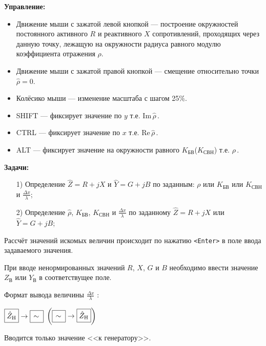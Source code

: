 \documentclass[12pt,a4paper]{article}
\newcommand{\im}{\mathrm{Im}}
\newcommand{\re}{\mathrm{Re}}
\newcommand{\ro}{\hat{\rho}}
\newcommand{\z}{\hat{Z}}
\newcommand{\y}{\hat{Y}}
\newcommand{\zv}{Z_{\text{В}}}
\newcommand{\yv}{Y_{\text{В}}}
\newcommand{\zn}{\hat{Z}_{\text{H}}}
\newcommand{\kb}{K_{\text{БВ}}}
\newcommand{\ks}{K_{\text{СВН}}}
\newcommand{\dxl}{\displaystyle\frac{\Delta x}{\lambda}}
\begin{document}
	\thispagestyle{empty}
	\textbf{Управление:}
	\begin{itemize}
		\item Движение мыши с зажатой левой кнопкой --- построение окружностей постоянного активного $R$ и
		реактивного $X$ сопротивлений, проходящих через данную точку, лежащую на окружности радиуса
		равного модулю коэффициента отражения $\rho$.
		\item Движение мыши с зажатой правой кнопкой --- смещение относительно точки $\ro = 0$.
		\item Колёсико мыши --- изменение масштаба с шагом 25\%.
		\item SHIFT --- фиксирует значение по $y$ т.е. $\im\,\ro$\,.
		\item CTRL --- фиксирует значение по $x$ т.е. $\re\,\ro$\,.
		\item ALT --- фиксирует значение на окружности равного $\kb$($\ks$) т.е. $\rho$\,.
	\end{itemize}
	
	\textbf{Задачи:}
	\begin{itemize}
		\item[1)] Определение $\z=R+jX$ и $\y=G+jB$ по заданным: $\rho$ или $\kb$ или $\ks$ и $\dxl$;
		\item[2)] Определение $\ro$, $\kb$, $\ks$ и $\dxl$ по заданному $\z=R+jX$ или $\y=G+jB$;
	\end{itemize}
	
	Рассчёт значений искомых величин происходит по нажатию \texttt{<Enter>} в поле ввода задаваемого значения.
	
	При вводе ненормированных значений $R$, $X$, $G$ и $B$ необходимо ввести значение $\zv$ или
	$\yv$ в соответствущее поле.
	
	Формат вывода величины $\dxl$ :
	\begin{center}
		$\boxed{\zn\mathstrut} \rightarrow \boxed{\,\sim\mathstrut}$
		$\biggl( \boxed{\,\sim\mathstrut} \rightarrow \boxed{\zn\mathstrut} \biggr)$
	\end{center}
	Вводится только значение <<к генератору>>. \\
	
\end{document}
